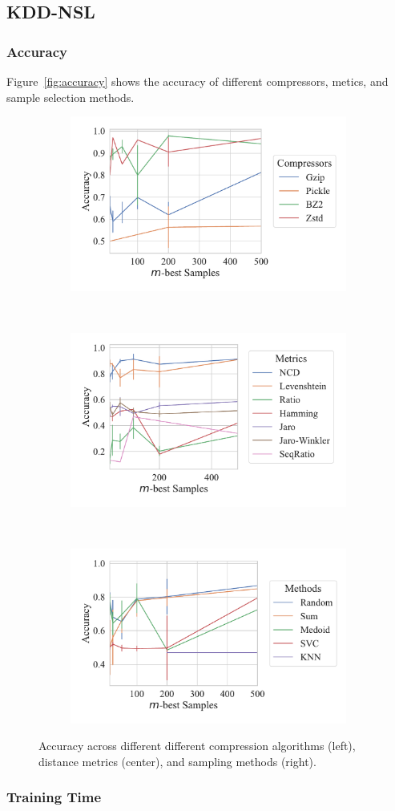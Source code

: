 \documentclass[sigconf]{acmart}
\begin{document}
\subsection{KDD-NSL}

\subsubsection{Accuracy}
Figure~\ref{fig:accuracy} shows the accuracy of different compressors, metics, and sample selection methods.

\begin{figure}
	\begin{subfigure}
		\centering
		\includegraphics[width=.32\textwidth]{figs/kdd_nsl/compressor_vs_accuracy.pdf}
	\end{subfigure}%
	~
	\begin{subfigure}
		\centering
		\includegraphics[width=.32\textwidth]{figs/kdd_nsl/metric_vs_accuracy.pdf}
	\end{subfigure}
	~
	\begin{subfigure}
		\centering
		\includegraphics[width=.32\textwidth]{figs/kdd_nsl/method_vs_accuracy.pdf}
	\end{subfigure}
	\caption{Accuracy across different different compression algorithms (left), distance metrics (center), and sampling methods (right).}
	\label{fig:accuracy_kdd}
\end{figure}

\subsubsection{Training Time}
\end{document}
